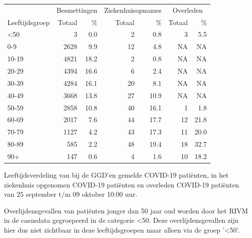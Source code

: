 \documentclass[
  english,
  man,floatsintext]{apa6}
\begin{document}
\begin{table}
\centering\begingroup\fontsize{11}{13}\selectfont

\begin{threeparttable}
\begin{tabular}{lrrrrrr}
\toprule
\multicolumn{1}{c}{ } & \multicolumn{2}{c}{Besmettingen} & \multicolumn{2}{c}{Ziekenhuisopnames} & \multicolumn{2}{c}{Overleden} \\
\cmidrule(l{3pt}r{3pt}){2-3} \cmidrule(l{3pt}r{3pt}){4-5} \cmidrule(l{3pt}r{3pt}){6-7}
Leeftijdsgroep & Totaal & \% & Totaal & \% & Totaal & \%\\
\midrule
<50 & 3 & 0.0 & 2 & 0.8 & 3 & 5.5\\
0-9 & 2628 & 9.9 & 12 & 4.8 & NA & NA\\
10-19 & 4821 & 18.2 & 2 & 0.8 & NA & NA\\
20-29 & 4394 & 16.6 & 6 & 2.4 & NA & NA\\
30-39 & 4284 & 16.1 & 20 & 8.1 & NA & NA\\
40-49 & 3668 & 13.8 & 27 & 10.9 & NA & NA\\
50-59 & 2858 & 10.8 & 40 & 16.1 & 1 & 1.8\\
60-69 & 2017 & 7.6 & 44 & 17.7 & 12 & 21.8\\
70-79 & 1127 & 4.2 & 43 & 17.3 & 11 & 20.0\\
80-89 & 585 & 2.2 & 48 & 19.4 & 18 & 32.7\\
90+ & 147 & 0.6 & 4 & 1.6 & 10 & 18.2\\
\bottomrule
\end{tabular}
\begin{tablenotes}
\item[1] Leeftijdsverdeling van bij de GGD’en gemelde COVID-19 patiënten, in het ziekenhuis opgenomen COVID-19 patiënten en overleden COVID-19 patiënten van 25 september t/m 09 oktober 10:00 uur.
\item[2] Overlijdensgevallen van patiënten jonger dan 50 jaar oud worden door het RIVM in de casusdata gegroepeerd in de categorie <50. Deze overlijdensgevallen zijn hier dus niet zichtbaar in deze leeftijdsgroepen maar alleen via de groep '<50'.
\end{tablenotes}
\end{threeparttable}
\endgroup{}
\end{table}

\newpage
\end{document}
